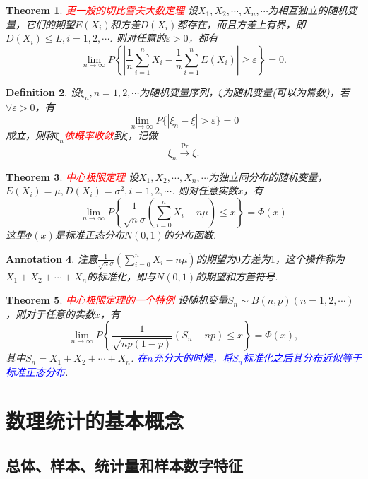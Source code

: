 \documentclass{article}
\newtheorem{theorem}{Theorem}[section]
\newtheorem{definition}[theorem]{Definition}
\newtheorem{annotation}[theorem]{Annotation}
\newcommand{\redt}[1]{\textcolor{red}{#1}}
\newcommand{\bluet}[1]{\textcolor{blue}{#1}}
\begin{document}
\begin{theorem}
\rm \redt{更一般的切比雪夫大数定理} 设$X_1,X_2,\cdots,X_n,\cdots$为相互独立的随机变量，它们的期望$E(X_i)$和方差$D(X_i)$都存在，而且方差上有界，即$D(X_i) \leq L, i = 1,2,\cdots$. 则对任意的$\varepsilon > 0$，都有
$$
\lim\limits_{n \to \infty} P\left\{ \left| \frac{1}{n} \sum\limits_{i=1}^n X_i - \frac{1}{n} \sum\limits_{i=1}^n E(X_i) \right| \geq \varepsilon \right\} = 0. 
$$
\end{theorem}

\begin{definition}
\rm 设$\xi_n, n = 1,2,\cdots$为随机变量序列，$\xi$为随机变量(可以为常数)，若$\forall \varepsilon > 0$，有
$$
\lim\limits_{n \to \infty} P\{ |\xi_n -\xi| > \varepsilon \} = 0
$$
成立，则称$\xi_n$\redt{依概率收敛}到$\xi$，记做
$$
\xi_n \xrightarrow{\text{Pr}} \xi.
$$
\end{definition}


\begin{theorem}
\rm \redt{中心极限定理} 设$X_1,X_2,\cdots,X_n,\cdots$为独立同分布的随机变量，$E(X_i)=\mu,D(X_i)=\sigma^2,i=1,2,\cdots$. 则对任意实数$x$，有
$$
\lim\limits_{n \rightarrow \infty}P\left\{\frac{1}{\sqrt{n}\sigma}\left(\sum\limits_{i=0}^nX_i - n\mu \right) \leq x\right\} = \Phi(x)
$$
这里$\Phi(x)$是标准正态分布$N(0,1)$的分布函数. 
\end{theorem}



\begin{annotation}
\rm 注意$\frac{1}{\sqrt{n}\sigma}(\sum\limits_{i=0}^nX_i - n\mu)$的期望为$0$方差为$1$，这个操作称为$X_1 + X_2 +\cdots + X_n$的标准化，即与$N(0,1)$的期望和方差符号. 
\end{annotation}

\begin{theorem}
\rm \redt{中心极限定理的一个特例} 设随机变量$S_n \sim B(n,p)(n=1,2,\cdots)$，则对于任意的实数$x$，有
$$
\lim\limits_{n \rightarrow \infty}P\left\{\frac{1}{\sqrt{np(1-p)}}(S_n - np) \leq x\right\} = \Phi(x),
$$
其中$S_n = X_1+X_2+\cdots + X_n$. \bluet{在$n$充分大的时候，将$S_n$标准化之后其分布近似等于标准正态分布}. 
\end{theorem}


\newpage
\section{数理统计的基本概念}

\subsection{总体、样本、统计量和样本数字特征}
\end{document}

